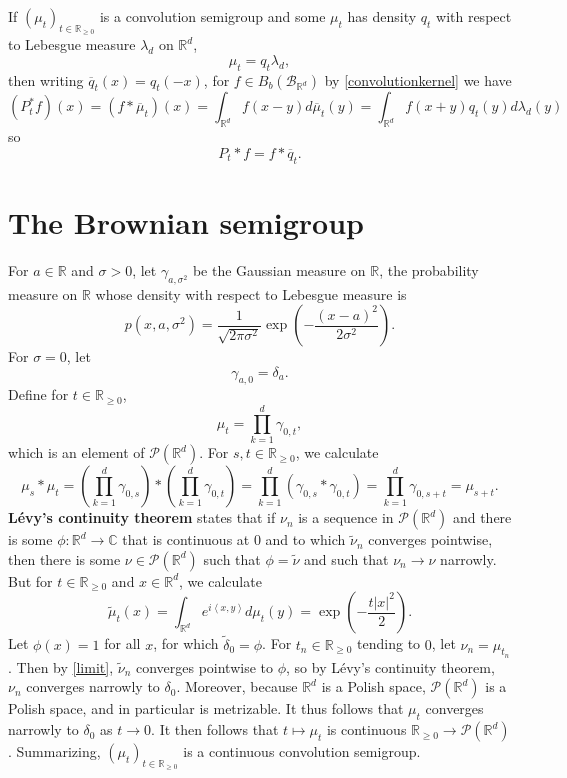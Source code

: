 \documentclass{article}
\newcommand{\inner}[2]{\left\langle #1, #2 \right\rangle}
\theoremstyle{definition}
\theoremstyle{definition}
\begin{document}
If $(\mu_t)_{t \in \mathbb{R}_{\geq 0}}$ is a convolution semigroup and
some  $\mu_t$ has density $q_t$ with respect to Lebesgue measure $\lambda_d$ on $\mathbb{R}^d$,
\[
\mu_t = q_t \lambda_d,
\]
then writing $\overline{q}_t(x) = q_t(-x)$, for $f \in B_b(\mathscr{B}_{\mathbb{R}^d})$ by \eqref{convolutionkernel} we have
\[
(P_t^*f)(x) = (f*\overline{\mu}_t)(x) = \int_{\mathbb{R}^d} f(x-y) d\overline{\mu}_t(y)
=\int_{\mathbb{R}^d} f(x+y) q_t(y) d\lambda_d(y)
\]
so
\begin{equation}
P_t*f = f*\overline{q}_t.
\label{qt}
\end{equation}

\section{The Brownian semigroup}
For $a \in \mathbb{R}$ and $\sigma>0$,
let $\gamma_{a,\sigma^2}$ be the Gaussian measure on $\mathbb{R}$, the probability measure on $\mathbb{R}$
whose density with respect to Lebesgue measure is
\[
p(x,a,\sigma^2) = \frac{1}{\sqrt{2\pi \sigma^2}} \exp\left(-\frac{(x-a)^2}{2\sigma^2}\right).
\]
For $\sigma=0$, let
\[
\gamma_{a,0} = \delta_a.
\]
Define for $t \in \mathbb{R}_{\geq 0}$,
\[
\mu_t = \prod_{k=1}^d \gamma_{0,t},
\]
which is an element of $\mathscr{P}(\mathbb{R}^d)$. 
For $s,t  \in \mathbb{R}_{\geq 0}$, we calculate
\[
\mu_s * \mu_t =  \left(\prod_{k=1}^d \gamma_{0,s}\right) * \left( \prod_{k=1}^d \gamma_{0,t} \right) 
=\prod_{k=1}^d (\gamma_{0,s} * \gamma_{0,t})
=\prod_{k=1}^d \gamma_{0,s+t}
=\mu_{s+t}.
\]
\textbf{L\'evy's continuity theorem} states that if $\nu_n$ is a sequence in $\mathscr{P}(\mathbb{R}^d)$
and there is some $\phi:\mathbb{R}^d \to \mathbb{C}$ that is continuous at $0$
and  to which $\tilde{\nu}_n$ converges pointwise, then there is some $\nu \in \mathscr{P}(\mathbb{R}^d)$ such that
$\phi = \tilde{\nu}$ and such that $\nu_n \to \nu$ narrowly.
But for $t \in \mathbb{R}_{\geq 0}$ and $x \in \mathbb{R}^d$, we calculate 
\begin{equation}
\tilde{\mu}_t(x) = \int_{\mathbb{R}^d} e^{i\inner{x}{y}} d\mu_t(y)
=\exp\left(-\frac{t|x|^2}{2}\right).
\label{limit}
\end{equation}
Let $\phi(x)=1$ for all $x$, for which $\tilde{\delta}_0=\phi$.
For $t_n \in \mathbb{R}_{\geq 0}$ tending to $0$, let
$\nu_n = \mu_{t_n}$. Then by \eqref{limit}, $\tilde{\nu}_n$ converges pointwise to $\phi$, so  by L\'evy's continuity theorem,
$\nu_n$ converges narrowly to $\delta_0$. 
Moreover, because $\mathbb{R}^d$ is a Polish space, $\mathscr{P}(\mathbb{R}^d)$ is a Polish space, and in particular
is metrizable. It thus follows that
$\mu_t$ converges narrowly to $\delta_0$ as $t \to 0$.
It then follows   that $t \mapsto \mu_t$ is continuous $\mathbb{R}_{\geq 0} \to \mathscr{P}(\mathbb{R}^d)$. 
Summarizing, $(\mu_t)_{t \in \mathbb{R}_{\geq 0}}$ is a continuous convolution semigroup.
\end{document}
